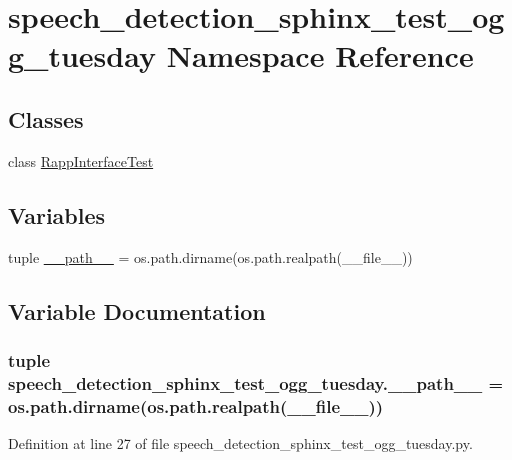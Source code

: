 \hypertarget{namespacespeech__detection__sphinx__test__ogg__tuesday}{\section{speech\-\_\-detection\-\_\-sphinx\-\_\-test\-\_\-ogg\-\_\-tuesday Namespace Reference}
\label{namespacespeech__detection__sphinx__test__ogg__tuesday}
}
\subsection*{Classes}
\begin{DoxyCompactItemize}
\item 
class \hyperlink{classspeech__detection__sphinx__test__ogg__tuesday_1_1RappInterfaceTest}{Rapp\-Interface\-Test}
\end{DoxyCompactItemize}
\subsection*{Variables}
\begin{DoxyCompactItemize}
\item 
tuple \hyperlink{namespacespeech__detection__sphinx__test__ogg__tuesday_abbbb7211b1cd026bb7412ae06c43a588}{\-\_\-\-\_\-path\-\_\-\-\_\-} = os.\-path.\-dirname(os.\-path.\-realpath(\-\_\-\-\_\-file\-\_\-\-\_\-))
\end{DoxyCompactItemize}


\subsection{Variable Documentation}
\hypertarget{namespacespeech__detection__sphinx__test__ogg__tuesday_abbbb7211b1cd026bb7412ae06c43a588}{
\subsubsection[{\-\_\-\-\_\-path\-\_\-\-\_\-}]{\setlength{\rightskip}{0pt plus 5cm}tuple speech\-\_\-detection\-\_\-sphinx\-\_\-test\-\_\-ogg\-\_\-tuesday.\-\_\-\-\_\-path\-\_\-\-\_\- = os.\-path.\-dirname(os.\-path.\-realpath(\-\_\-\-\_\-file\-\_\-\-\_\-))}}\label{namespacespeech__detection__sphinx__test__ogg__tuesday_abbbb7211b1cd026bb7412ae06c43a588}


Definition at line 27 of file speech\-\_\-detection\-\_\-sphinx\-\_\-test\-\_\-ogg\-\_\-tuesday.\-py.

